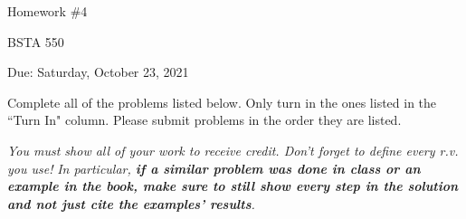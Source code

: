 \documentclass[12pt]{article}
\begin{document}
\begin{center}

Homework \#4

BSTA 550

Due: Saturday, October 23, 2021

%
\bigskip



\end{center}


\bigskip

Complete all of the problems listed below. \newline 
Only turn in the ones listed in the ``Turn In" column. \newline
Please submit problems in the order they are listed.

\bigskip


\textit{You must show all of your work to receive credit. Don't forget to define every r.v. you use!}  \newline 
\textit{In particular, \textbf{if a similar problem was done in class or an example in the book, make sure to still show every step in the solution and not just cite the examples' results}.}  \newline 



\end{document}
